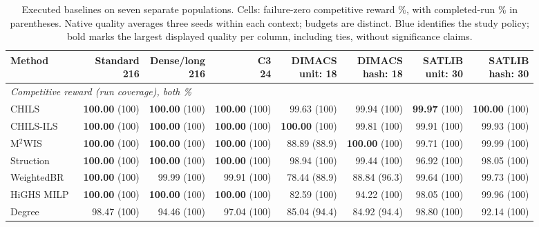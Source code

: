 \begin{table}[t]
\centering
\caption{Executed baselines on seven separate populations. Cells: failure-zero competitive reward \%, with completed-run \% in parentheses. Native quality averages three seeds within each context; budgets are distinct. Blue identifies the study policy; bold marks the largest displayed quality per column, including ties, without significance claims.}
\label{tab:baseline-v05}
\setlength{\tabcolsep}{3pt}
\begin{tabular}{lrrrrrrr}
\toprule
Method & \shortstack{Standard\\216} & \shortstack{Dense/long\\216} & \shortstack{C3\\24} & \shortstack{DIMACS\\unit: 18} & \shortstack{DIMACS\\hash: 18} & \shortstack{SATLIB\\unit: 30} & \shortstack{SATLIB\\hash: 30} \\
\midrule
\multicolumn{8}{l}{\textit{Competitive reward (run coverage), both \%}} \\
CHILS~\cite{grossmann2025chils} & \textbf{100.00} (100) & \textbf{100.00} (100) & \textbf{100.00} (100) & 99.63 (100) & 99.94 (100) & \textbf{99.97} (100) & \textbf{100.00} (100) \\
CHILS-ILS~\cite{grossmann2025chils} & \textbf{100.00} (100) & \textbf{100.00} (100) & \textbf{100.00} (100) & \textbf{100.00} (100) & 99.81 (100) & 99.91 (100) & 99.93 (100) \\
M$^2$WIS~\cite{grossmann2024mmwis} & \textbf{100.00} (100) & \textbf{100.00} (100) & \textbf{100.00} (100) & 88.89 (88.9) & \textbf{100.00} (100) & 99.71 (100) & 99.99 (100) \\
Struction~\cite{gellner2021struction} & \textbf{100.00} (100) & \textbf{100.00} (100) & \textbf{100.00} (100) & 98.94 (100) & 99.44 (100) & 96.92 (100) & 98.05 (100) \\
WeightedBR~\cite{lamm2019weighted} & \textbf{100.00} (100) & 99.99 (100) & 99.91 (100) & 78.44 (88.9) & 88.84 (96.3) & 99.64 (100) & 99.73 (100) \\
HiGHS MILP~\cite{huangfu2018highs} & \textbf{100.00} (100) & \textbf{100.00} (100) & \textbf{100.00} (100) & 82.59 (100) & 94.22 (100) & 98.05 (100) & 99.96 (100) \\
Degree & 98.47 (100) & 94.46 (100) & 97.04 (100) & 85.04 (94.4) & 84.92 (94.4) & 98.80 (100) & 92.14 (100) \\

\end{tabular}
\end{table}
